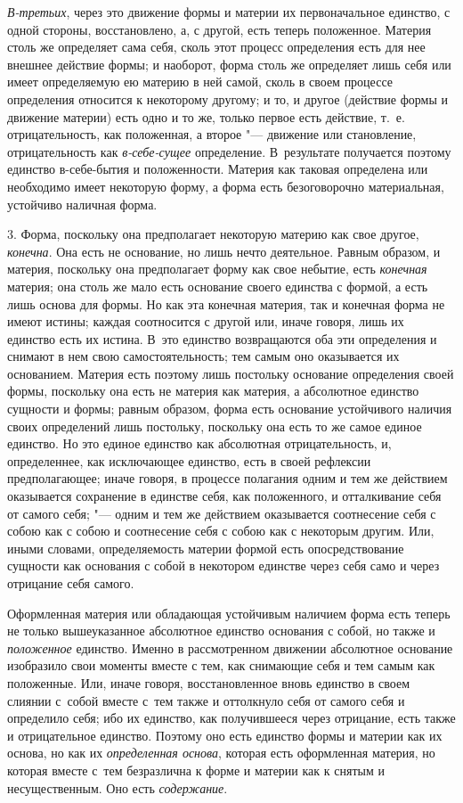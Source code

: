{\em В-третьих}, через это движение формы и материи их первоначальное единство,
с одной стороны, восстановлено, а, с другой, есть теперь положенное. Материя
столь же определяет сама себя, сколь этот процесс определения есть для нее
внешнее действие формы; и наоборот, форма столь же определяет лишь себя или
имеет определяемую ею материю в ней самой, сколь в своем процессе определения
относится к некоторому другому; и то, и другое (действие формы и движение
материи) есть одно и то же, только первое есть действие, т.~е. отрицательность,
как положенная, а второе "--- движение или становление, отрицательность как
{\em в-себе-сущее} определение. В~результате получается поэтому единство
в-себе-бытия и положенности. Материя как таковая определена или необходимо
имеет некоторую форму, а форма есть безоговорочно материальная, устойчиво
наличная форма.

3. Форма, поскольку она предполагает некоторую материю как свое другое,
{\em конечна}. Она есть не основание, но лишь нечто деятельное. Равным образом,
и материя, поскольку она предполагает форму как свое небытие, есть
{\em конечная} материя; она столь же мало есть основание своего единства с
формой, а есть лишь основа для формы. Но как эта конечная материя, так и
конечная форма не имеют истины; каждая соотносится с другой или, иначе говоря,
лишь их единство есть их истина. В~это единство возвращаются оба эти
определения и снимают в нем свою самостоятельность; тем самым оно оказывается
их основанием. Материя есть поэтому лишь постольку основание определения своей
формы, поскольку она есть не материя как материя, а абсолютное единство
сущности и формы; равным образом, форма есть основание устойчивого наличия
своих определений лишь постольку, поскольку она есть то же самое единое
единство. Но это единое единство как абсолютная отрицательность, и,
определеннее, как исключающее единство, есть в своей рефлексии предполагающее;
иначе говоря, в процессе полагания одним и тем же действием оказывается
сохранение в единстве себя, как положенного, и отталкивание себя от самого
себя; "--- одним и тем же действием оказывается соотнесение себя с собою как с
собою и соотнесение себя с собою как с некоторым другим. Или, иными словами,
определяемость материи формой есть опосредствование сущности как основания с
собой в некотором единстве через себя само и через отрицание себя самого.

Оформленная материя или обладающая устойчивым наличием форма есть теперь не
только вышеуказанное абсолютное единство основания с собой, но также и
{\em положенное} единство. Именно в рассмотренном движении абсолютное основание
изобразило свои моменты вместе с тем, как снимающие себя и тем самым как
положенные. Или, иначе говоря, восстановленное вновь единство в своем слиянии
с~собой вместе с~тем также и оттолкнуло себя от самого себя и определило себя;
ибо их единство, как получившееся через отрицание, есть также и отрицательное
единство. Поэтому оно есть единство формы и материи как их основа, но как их
{\em определенная основа}, которая есть оформленная материя, но которая вместе
с~тем безразлична к форме и материи как к снятым и несущественным. Оно есть
{\em содержание}.

